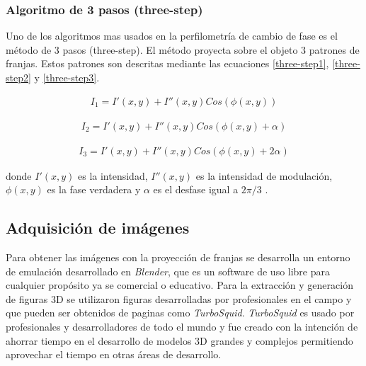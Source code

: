 \documentclass[10pt,letterpaper]{article}
\begin{document}
\subsubsection{Algoritmo de 3 pasos (three-step)}
Uno de los algoritmos mas usados en la perfilometría de cambio de fase es el método de 3 pasos (three-step). El método proyecta sobre el objeto 3 patrones de franjas. Estos patrones son descritas mediante las ecuaciones \ref{three-step1}, \ref{three-step2} y \ref{three-step3}.

\begin{eqnarray}
\label{three-step1}
I_1=I'\left ( x,y \right )+I''\left ( x,y \right )Cos(\phi \left ( x,y \right ))
\end{eqnarray}

\begin{eqnarray}
\label{three-step2}
I_2=I'\left ( x,y \right )+I''\left ( x,y \right )Cos(\phi \left ( x,y \right )+\alpha)
\end{eqnarray}

\begin{eqnarray}
\label{three-step3}
I_3=I'\left ( x,y \right )+I''\left ( x,y \right )Cos(\phi \left ( x,y \right )+ 2\alpha)
\end{eqnarray}

donde $I'\left ( x,y \right )$ es la intensidad, $I''\left ( x,y \right )$ es la intensidad de modulación, $\phi \left ( x,y \right )$ es la fase verdadera y $\alpha$  es el desfase igual a $2\pi/3$ \cite{Kato:}\cite{Schr:}\cite{ Garc:}.

\subsection{Adquisición de imágenes}
Para obtener las imágenes con la proyección de franjas se desarrolla un entorno de emulación desarrollado en \textit{Blender}, que es un software de uso libre para cualquier propósito ya se comercial o educativo. Para la extracción y generación de figuras 3D se utilizaron figuras desarrolladas por profesionales en el campo y que pueden ser obtenidos de paginas como \textit{TurboSquid}. \textit{TurboSquid} es usado por profesionales y desarrolladores de todo el mundo y fue creado con la intención de ahorrar tiempo en el desarrollo de modelos 3D grandes y complejos permitiendo aprovechar el tiempo en otras áreas de desarrollo.
\end{document}

